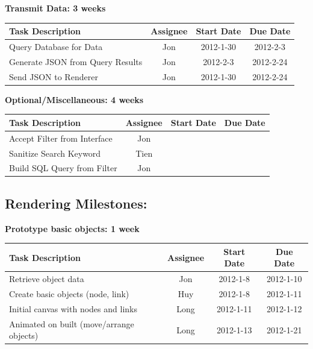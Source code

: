 \documentclass[12pt, letterpaper]{article}
\begin{document}
  \begin{center}
		{\bf Transmit Data: 3 weeks}
    \begin{tabular}{| p{8.3cm} || c | c | c | }
      \hline
      Task Description & Assignee & Start Date & Due Date \\
      \hline
	    Query Database for Data & Jon & 2012-1-30 & 2012-2-3 \\
	    Generate JSON from Query Results & Jon & 2012-2-3 & 2012-2-24 \\
	    Send JSON to Renderer & Jon & 2012-1-30 & 2012-2-24 \\
      \hline
    \end{tabular}
  \end{center}
  
  \begin{center}
		{\bf Optional/Miscellaneous: 4 weeks}
    \begin{tabular}{| p{8.3cm} || c | c | c | }
      \hline
      Task Description & Assignee & Start Date & Due Date \\
      \hline
	    Accept Filter from Interface & Jon & & \\
	    Sanitize Search Keyword & Tien & & \\
	    Build SQL Query from Filter & Jon & & \\
      \hline
    \end{tabular}
  \end{center}
  
\subsection{Rendering Milestones:}

  \begin{center}
		{\bf Prototype basic objects: 1 week}
    \begin{tabular}{| p{8.3cm} || c | c | c | }
      \hline
      Task Description & Assignee & Start Date & Due Date \\
      \hline
			Retrieve object data & Jon & 2012-1-8 & 2012-1-10 \\
	    Create basic objects (node, link)& Huy & 2012-1-8 & 2012-1-11 \\
			Initial canvas with nodes and links & Long & 2012-1-11 & 2012-1-12 \\
	    Animated on built (move/arrange objects) & Long & 2012-1-13 & 2012-1-21 \\
      \hline
    \end{tabular}
  \end{center}
\end{document}
